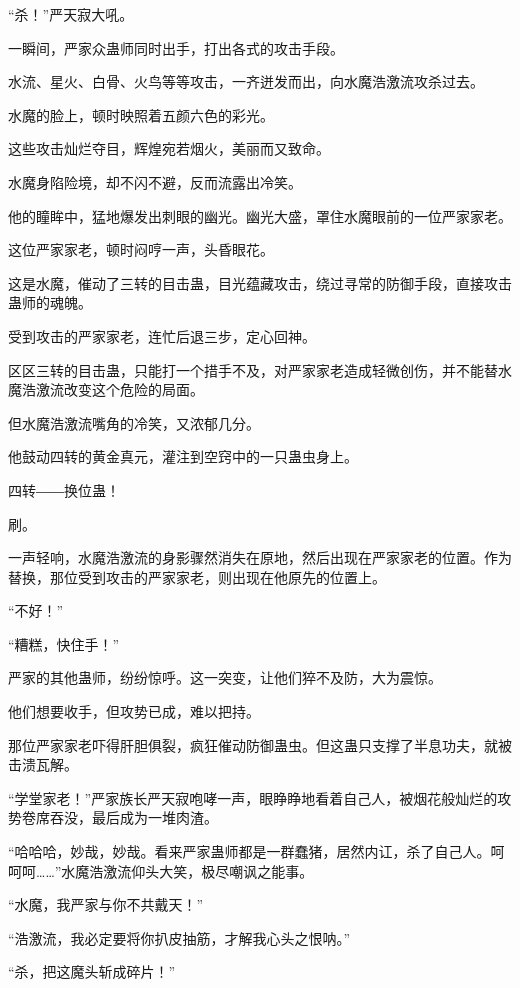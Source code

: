 
\begin{this_body}

“杀！”严天寂大吼。

一瞬间，严家众蛊师同时出手，打出各式的攻击手段。

水流、星火、白骨、火鸟等等攻击，一齐迸发而出，向水魔浩激流攻杀过去。

水魔的脸上，顿时映照着五颜六色的彩光。

这些攻击灿烂夺目，辉煌宛若烟火，美丽而又致命。

水魔身陷险境，却不闪不避，反而流露出冷笑。

他的瞳眸中，猛地爆发出刺眼的幽光。幽光大盛，罩住水魔眼前的一位严家家老。

这位严家家老，顿时闷哼一声，头昏眼花。

这是水魔，催动了三转的目击蛊，目光蕴藏攻击，绕过寻常的防御手段，直接攻击蛊师的魂魄。

受到攻击的严家家老，连忙后退三步，定心回神。

区区三转的目击蛊，只能打一个措手不及，对严家家老造成轻微创伤，并不能替水魔浩激流改变这个危险的局面。

但水魔浩激流嘴角的冷笑，又浓郁几分。

他鼓动四转的黄金真元，灌注到空窍中的一只蛊虫身上。

四转――换位蛊！

刷。

一声轻响，水魔浩激流的身影骤然消失在原地，然后出现在严家家老的位置。作为替换，那位受到攻击的严家家老，则出现在他原先的位置上。

“不好！”

“糟糕，快住手！”

严家的其他蛊师，纷纷惊呼。这一突变，让他们猝不及防，大为震惊。

他们想要收手，但攻势已成，难以把持。

那位严家家老吓得肝胆俱裂，疯狂催动防御蛊虫。但这蛊只支撑了半息功夫，就被击溃瓦解。

“学堂家老！”严家族长严天寂咆哮一声，眼睁睁地看着自己人，被烟花般灿烂的攻势卷席吞没，最后成为一堆肉渣。

“哈哈哈，妙哉，妙哉。看来严家蛊师都是一群蠢猪，居然内讧，杀了自己人。呵呵呵……”水魔浩激流仰头大笑，极尽嘲讽之能事。

“水魔，我严家与你不共戴天！”

“浩激流，我必定要将你扒皮抽筋，才解我心头之恨呐。”

“杀，把这魔头斩成碎片！”


\end{this_body}
